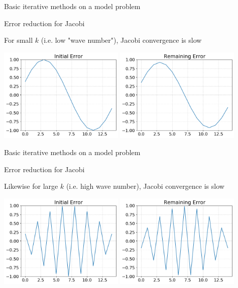 \documentclass[18pt,xcolor=table]{beamer}
\begin{document}
\begin{frame}{Basic iterative methods on a model problem}
\begin{block}{Error reduction for Jacobi}
\bit
\item For small $k$ (i.e. low "wave number"), Jacobi convergence is slow
\eit
\end{block}
\begin{center}
\includegraphics[width=0.45\textwidth]{../figures/jacobiInitialErrLowK}
\includegraphics[width=0.45\textwidth]{../figures/jacobiRemainingErrLowK}
\end{center}
\end{frame}

\begin{frame}{Basic iterative methods on a model problem}
\begin{block}{Error reduction for Jacobi}
\bit
\item Likewise for large $k$ (i.e. high wave number), Jacobi convergence is slow
\eit
\end{block}
\begin{center}
\includegraphics[width=0.45\textwidth]{../figures/jacobiInitialErrHighK}
\includegraphics[width=0.45\textwidth]{../figures/jacobiRemainingErrHighK}
\end{center}
\end{frame}
\end{document}
